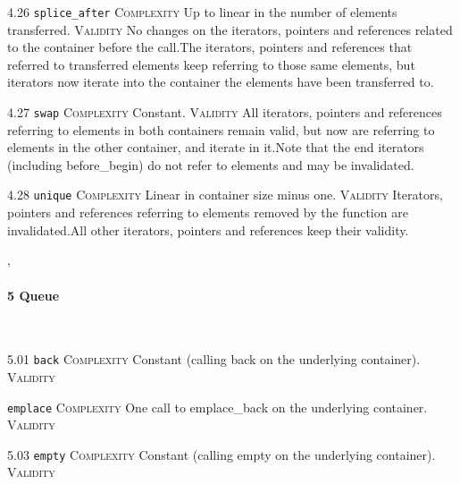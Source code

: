 \noindent\textcolor{corange}{4.26 \texttt{splice\_after}} \textsc{Complexity} Up to linear in the number of elements transferred. \textsc{Validity} No changes on the iterators, pointers and references related to the container before the call.The iterators, pointers and references that referred to transferred elements keep referring to those same elements, but iterators now iterate into the container the elements have been transferred to.\vspace{0.5em}

\noindent\textcolor{cgreen}{4.27 \texttt{swap}} \textsc{Complexity} Constant. \textsc{Validity} All iterators, pointers and references referring to elements in both containers remain valid, but now are referring to elements in the other container, and iterate in it.Note that the end iterators (including before\_begin) do not refer to elements and may be invalidated.\vspace{0.5em}

\noindent\textcolor{corange}{4.28 \texttt{unique}} \textsc{Complexity} Linear in container size minus one. \textsc{Validity} Iterators, pointers and references referring to elements removed by the function are invalidated.All other iterators, pointers and references keep their validity.\vspace{0.5em}


\sep
{}
\paragraph{5 Queue}\mbox{}\\
\noindent\textcolor{cgreen}{5.01 \texttt{back}} \textsc{Complexity} Constant (calling back on the underlying container). \textsc{Validity} \vspace{0.5em}

 \texttt{emplace} \textsc{Complexity} One call to emplace\_back on the underlying container. \textsc{Validity} \vspace{0.5em}

\noindent\textcolor{cgreen}{5.03 \texttt{empty}} \textsc{Complexity} Constant (calling empty on the underlying container). \textsc{Validity} \vspace{0.5em}

